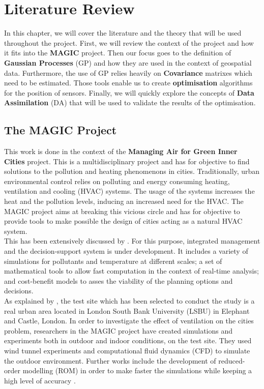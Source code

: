 \chapter{Literature Review}


In this chapter, we will cover the literature and the theory that will be used throughout the project. First, we will review the context of the project and how it fits into the \textbf{MAGIC} project. Then our focus goes to the definition of \textbf{Gaussian Processes} (GP) and how they are used in the context of geospatial data. Furthermore, the use of GP relies heavily on \textbf{Covariance} matrixes which need to be estimated. Those tools enable us to create \textbf{optimisation} algorithms for the position of sensors. Finally, we will quickly explore the concepts of \textbf{Data Assimilation} (DA) that will be used to validate the results of the optimisation. 

\section{The MAGIC Project}

This work is done in the context of the \textbf{Managing Air for Green Inner Cities} project. This is a multidisciplinary project and has for objective to find solutions to the pollution and heating phenomenons in cities. Traditionally, urban environmental control relies on polluting and energy consuming heating, ventilation and cooling (HVAC) systems. The usage of the systems increases the heat and the pollution levels, inducing an increased need for the HVAC. The MAGIC project aims at breaking this vicious circle and has for objective to provide tools to make possible the design of cities acting as a natural HVAC system. \\


This has been extensively discussed by  \cite{song_natural_2018}.  For this purpose, integrated management and the decision-support system is under development. It includes a variety of simulations for pollutants and temperature at different scales; a set of mathematical tools to allow fast computation in the context of real-time analysis; and cost-benefit models to asses the viability of the planning options and decisions. \\

As explained by \cite{song_natural_2018}, the test site which has been selected to conduct the study is a real urban area located in London South Bank University (LSBU) in  Elephant and Castle, London. In order to investigate the effect of ventilation on the cities problem, researchers in the MAGIC project have created simulations and experiments both in outdoor and indoor conditions, on the test site. They used wind tunnel experiments and computational fluid dynamics (CFD) to simulate the outdoor environment. Further works include the development of reduced-order modelling (ROM) in order to make faster the simulations while keeping a high level of accuracy \citep{arcucci_effective_2018}. \\

